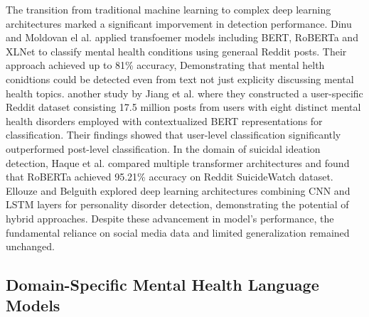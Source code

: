 \documentclass{article}
\begin{document}
The transition from traditional machine learning to complex deep learning architectures marked a significant imporvement in detection performance. Dinu and Moldovan el al. \cite{dinu2021automatic} applied transfoemer models including BERT, RoBERTa and XLNet to classify mental health conditions using generaal Reddit posts. Their approach achieved up to 81\% accuracy, Demonstrating that mental helth conidtions could be detected even from text not just explicity discussing mental health topics. another study by Jiang et al. \cite{jiang-etal-2020-detection} where they constructed a user-specific Reddit dataset consisting 17.5 million posts from users with eight distinct mental health disorders employed with contextualized BERT representations for classification. Their findings showed that user-level classification significantly outperformed post-level classification. In the domain of suicidal ideation detection, Haque et al. \cite{suicidalideationtransformers2020} compared multiple transformer architectures and found that RoBERTa achieved 95.21\% accuracy on Reddit SuicideWatch dataset. Ellouze and Belguith \cite{ellouze2022deep} explored deep learning architectures combining CNN and LSTM layers for personality disorder detection, demonstrating the potential of hybrid approaches. Despite these advancement in model's performance, the fundamental reliance on social media data and limited generalization remained unchanged.
















\subsection{Domain-Specific Mental Health Language Models}

\end{document}
